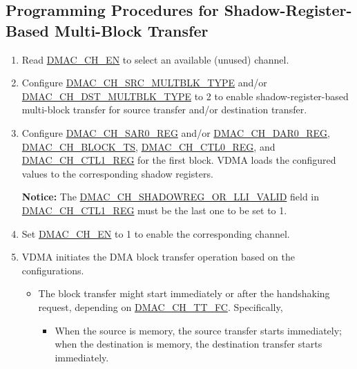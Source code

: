 \documentclass[main\_\_EN.tex]{subfiles}
\begin{document}
\subsection{Programming Procedures for Shadow-Register-Based Multi-Block Transfer}

\begin{enumerate}
    \item Read \hyperref[fielddesc:DMACCH1EN]{DMAC\_CH\_EN} to select an available (unused) channel.

    \item Configure \hyperref[fielddesc:DMACCHNSRCMULTBLKTYPE]{DMAC\_CH\_SRC\_MULTBLK\_TYPE} and/or \hyperref[fielddesc:DMACCHNDSTMULTBLKTYPE]{DMAC\_CH\_DST\_MULTBLK\_TYPE} to 2 to enable shadow-register-based multi-block transfer for source transfer and/or destination transfer.


    \item Configure \hyperref[regdesc:DMACCHNSAR0REG]{DMAC\_CH\_SAR0\_REG} and/or \hyperref[regdesc:DMACCHNDAR0REG]{DMAC\_CH\_DAR0\_REG}, \hyperref[fielddesc:DMACCHNBLOCKTS]{DMAC\_CH\_BLOCK\_TS}, \hyperref[regdesc:DMACCHNCTL0REG]{DMAC\_CH\_CTL0\_REG}, and \hyperref[regdesc:DMACCHNCTL1REG]{DMAC\_CH\_CTL1\_REG} for the first block. VDMA loads the configured values to the corresponding shadow registers.

    {\bfseries Notice:} The \hyperref[fielddesc:DMACCHNSHADOWREGORLLIVALID]{DMAC\_CH\_SHADOWREG\_OR\_LLI\_VALID} field in \hyperref[regdesc:DMACCHNCTL1REG]{DMAC\_CH\_CTL1\_REG} must be the last one to be set to 1.

    \item Set \hyperref[fielddesc:DMACCH1EN]{DMAC\_CH\_EN} to 1 to enable the corresponding channel.

    \item VDMA initiates the DMA block transfer operation based on the configurations.

        \begin{itemize}
        \item The block transfer might start immediately or after the handshaking request, depending on \hyperref[fielddesc:DMACCHNTTFC]{DMAC\_CH\_TT\_FC}. Specifically,

            \begin{itemize}
                \item When the source is memory, the source transfer starts immediately; when the destination is memory, the destination transfer starts immediately.


\end{itemize}
\end{itemize}
\end{enumerate}
\end{document}
